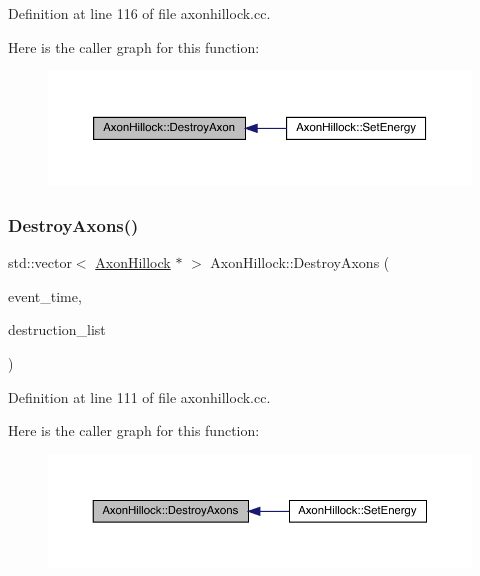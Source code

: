 Definition at line 116 of file axonhillock.\+cc.

Here is the caller graph for this function\+:
\nopagebreak
\begin{figure}[H]
\begin{center}
\leavevmode
\includegraphics[width=350pt]{class_axon_hillock_a031b2cc7292d023506a5124639a941a7_icgraph}
\end{center}
\end{figure}
\mbox{\label{class_axon_hillock_a083c918c64c60f3cea1d39aa8e0c6fba}} 
\subsubsection{\texorpdfstring{Destroy\+Axons()}{DestroyAxons()}}
{\footnotesize\ttfamily std\+::vector$<$ \hyperlink{class_axon_hillock}{Axon\+Hillock} $\ast$ $>$ Axon\+Hillock\+::\+Destroy\+Axons (\begin{DoxyParamCaption}\item[{std\+::chrono\+::time\+\_\+point$<$ \hyperlink{universe_8h_a0ef8d951d1ca5ab3cfaf7ab4c7a6fd80}{Clock} $>$}]{event\+\_\+time,  }\item[{std\+::vector$<$ \hyperlink{class_axon_hillock}{Axon\+Hillock} $\ast$$>$}]{destruction\+\_\+list }\end{DoxyParamCaption})}



Definition at line 111 of file axonhillock.\+cc.

Here is the caller graph for this function\+:
\nopagebreak
\begin{figure}[H]
\begin{center}
\leavevmode
\includegraphics[width=350pt]{class_axon_hillock_a083c918c64c60f3cea1d39aa8e0c6fba_icgraph}
\end{center}
\end{figure}
\mbox{\label{class_axon_hillock_a08fde7d1b8a40ba7a052315f95b743f0}} 
